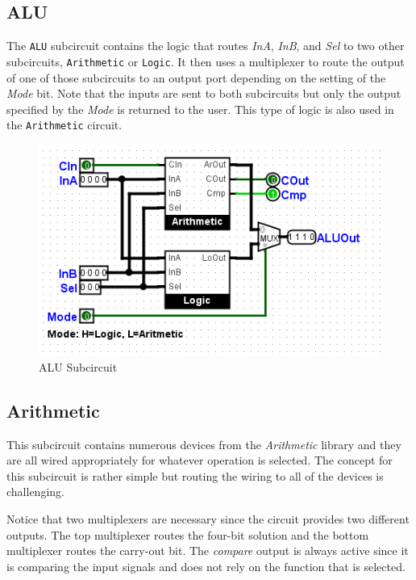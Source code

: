 \subsection{ALU}

The \lstinline[columns=fixed]|ALU| subcircuit contains the logic that routes \textit{InA}, \textit{InB}, and \textit{Sel} to two other subcircuits, \lstinline[columns=fixed]|Arithmetic| or \lstinline[columns=fixed]|Logic|. It then uses a multiplexer to route the output of one of those subcircuits to an output port depending on the setting of the \textit{Mode} bit. Note that the inputs are sent to both subcircuits but only the output specified by the \textit{Mode} is returned to the user. This type of logic is also used in the \lstinline[columns=fixed]|Arithmetic| circuit.

\begin{figure}[H]
	\centering
	\includegraphics[width=\maxwidth{.95\linewidth}]{gfx/04-02}
	\caption{ALU Subcircuit}
	\label{fig:04-02}
\end{figure}

\subsection{Arithmetic}

This subcircuit contains numerous devices from the \textit{Arithmetic} library and they are all wired appropriately for whatever operation is selected. The concept for this subcircuit is rather simple but routing the wiring to all of the devices is challenging.

Notice that two multiplexers are necessary since the circuit provides two different outputs. The top multiplexer routes the four-bit solution and the bottom multiplexer routes the carry-out bit. The \textit{compare} output is always active since it is comparing the input signals and does not rely on the function that is selected.

